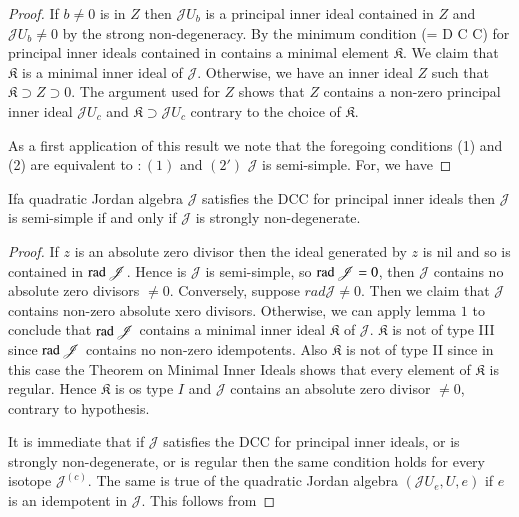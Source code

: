 \begin{proof}
If $b\neq 0$ is in $Z$ then $\mathscr{J}U_b$ is a principal
inner ideal contained in $Z$ and $\mathscr{J}U_b\neq 0$ by
the strong non-degeneracy. By the minimum condition (= D C C) for
principal inner ideals contained in contains a minimal element
$\mathfrak{K}$. We claim that $\mathfrak{K}$ is a minimal inner ideal
of $\mathscr{J}$. Otherwise, we have an inner ideal $Z$
such that $\mathfrak{K}\supset Z\supset 0$. The argument
used for $Z$ shows that $Z$ contains a non-zero
principal inner ideal $\mathscr{J}U_c$ and $\mathfrak{K}\supset
\mathscr{J} U_{c}$ contrary to the choice of $\mathfrak{K}$.

As a first application of this result we note that the foregoing
conditions (1) and (2) are equivalent to $:(1)$ and $(2')$
$\mathscr{J}$ is semi-simple. For, we have
\end{proof}

\begin{thm}\label{c3:thm6}
If\pageoriginale a quadratic Jordan algebra $\mathscr{J}$ satisfies
the DCC for principal inner ideals then $\mathscr{J}$ is semi-simple
if and only if $\mathscr{J}$ is strongly non-degenerate.
\end{thm}

\begin{proof}
If $z$ is an absolute zero divisor then the ideal generated by $z$ is
nil and so is contained in $\operatorname{rad}\mathscr{J}$. Hence is $\mathscr{J}$ is
semi-simple, so $\operatorname{rad}\mathscr{J}=0$, then $\mathscr{J}$ contains no
absolute zero divisors $\neq 0$. Conversely, suppose $rad
\mathscr{J}\neq 0$. Then we claim that $\mathscr{J}$ contains
non-zero absolute xero divisors. Otherwise, we can apply lemma $1$ to
conclude that $\operatorname{rad} \mathscr{J}$ contains a minimal inner ideal
$\mathfrak{K}$ of $\mathscr{J}$. $\mathfrak{K}$ is not of type III
since $\operatorname{rad} \mathscr{J}$ contains no non-zero idempotents. Also
$\mathfrak{K}$ is not of type II since in this case the Theorem on
Minimal Inner Ideals shows that every element of $\mathfrak{K}$ is
regular. Hence $\mathfrak{K}$ is os type $I$ and $\mathscr{J}$
contains an absolute zero divisor $\neq 0$, contrary to hypothesis.

It is immediate that if $\mathscr{J}$ satisfies the DCC for principal
inner ideals, or is strongly non-degenerate, or is regular then the
same condition holds for every isotope $\mathscr{J}^{(c)}$. The same
is true of the quadratic Jordan algebra $(\mathscr{J}U_e,U,e)$ if $e$
is an idempotent in $\mathscr{J}$. This follows from
\end{proof}

